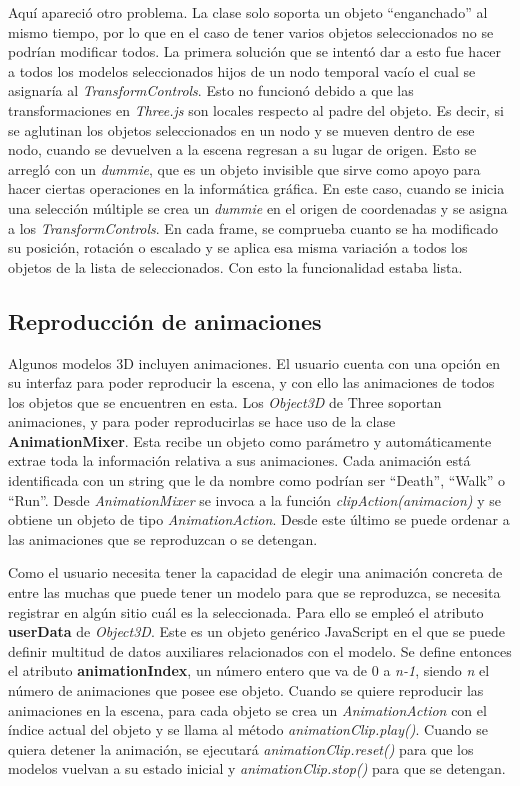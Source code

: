 Aquí apareció otro problema. La clase solo soporta un objeto ``enganchado'' al mismo tiempo, por lo que en el caso de tener varios objetos seleccionados no se podrían modificar todos. La primera solución que se intentó dar a esto fue hacer a todos los modelos seleccionados hijos de un nodo temporal vacío el cual se asignaría al \textit{TransformControls}. Esto no funcionó debido a que las transformaciones en \textit{Three.js} son locales respecto al padre del objeto. Es decir, si se aglutinan los objetos seleccionados en un nodo y se mueven dentro de ese nodo, cuando se devuelven a la escena regresan a su lugar de origen. Esto se arregló con un \textit{dummie}, que es un objeto invisible que sirve como apoyo para hacer ciertas operaciones en la informática gráfica. En este caso, cuando se inicia una selección múltiple se crea un \textit{dummie} en el origen de coordenadas y se asigna a los \textit{TransformControls}. En cada frame, se comprueba cuanto se ha modificado su posición, rotación o escalado y se aplica esa misma variación a todos los objetos de la lista de seleccionados. Con esto la funcionalidad estaba lista.

\subsection{Reproducción de animaciones}

Algunos modelos 3D incluyen animaciones. El usuario cuenta con una opción en su interfaz para poder reproducir la escena, y con ello las animaciones de todos los objetos que se encuentren en esta. Los \textit{Object3D} de Three soportan animaciones, y para poder reproducirlas se hace uso de la clase \textbf{AnimationMixer}. Esta recibe un objeto como parámetro y automáticamente extrae toda la información relativa a sus animaciones. Cada animación está identificada con un string que le da nombre como podrían ser ``Death'', ``Walk'' o ``Run''. Desde \textit{AnimationMixer} se invoca a la función \textit{clipAction(animacion)} y se obtiene un objeto de tipo \textit{AnimationAction}. Desde este último se puede ordenar a las animaciones que se reproduzcan o se detengan.

Como el usuario necesita tener la capacidad de elegir una animación concreta de entre las muchas que puede tener un modelo para que se reproduzca, se necesita registrar en algún sitio cuál es la seleccionada. Para ello se empleó el atributo \textbf{userData} de \textit{Object3D}. Este es un objeto genérico JavaScript en el que se puede definir multitud de datos auxiliares relacionados con el modelo. Se define entonces el atributo \textbf{animationIndex}, un número entero que va de 0 a \textit{n-1}, siendo \textit{n} el número de animaciones que posee ese objeto. Cuando se quiere reproducir las animaciones en la escena, para cada objeto se crea un \textit{AnimationAction} con el índice actual del objeto y se llama al método \textit{animationClip.play()}. Cuando se quiera detener la animación, se ejecutará \textit{animationClip.reset()} para que los modelos vuelvan a su estado inicial y \textit{animationClip.stop()} para que se detengan.

